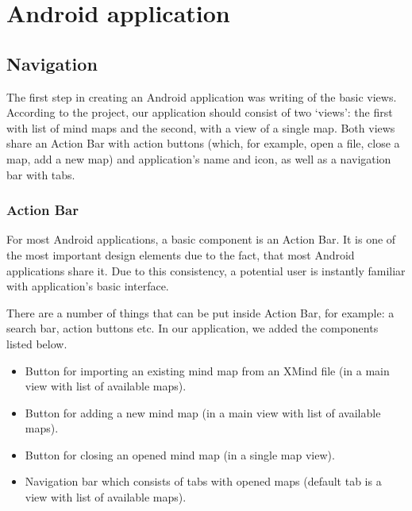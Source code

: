 %
%
%
%
%

\section{Android application}
\label{sec:android-app}

\subsection{Navigation}
\label{subsec:drawing}
The first step in creating an Android application was writing of the basic views. According to the project, our application should consist of two `views': the first with list of mind maps and the second, with a view of a single map. Both views share an Action Bar with action buttons (which, for example, open a file, close a map, add a new map) and application's name and icon, as well as a navigation bar with tabs.

\subsubsection{Action Bar}
\label{subsubsec:action-bar}
For most Android applications, a basic component is an Action Bar. It is one of the most important design elements due to the fact, that most Android applications share it. Due to this consistency, a potential user is instantly familiar with application's basic interface.

There are a number of things that can be put inside Action Bar, for example: a search bar, action buttons etc. In our application, we added the components listed below.

\begin{itemize}
	\item Button for importing an existing mind map  from an XMind file (in a main view with list of available maps).
	\item Button for adding a new mind map (in a main view with list of available maps).
	\item Button for closing an opened mind map (in a single map view).
	\item Navigation bar which consists of tabs with opened maps (default tab is a view with list of available maps).
\end{itemize}

